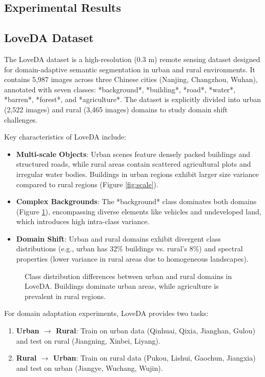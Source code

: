 \documentclass{article}
\begin{document}
\begin{multicols}{2}
		\section{Experimental Results}
		\subsection{LoveDA Dataset}  
		The LoveDA dataset \cite{loveda2021} is a high-resolution (0.3 m) remote sensing dataset designed for domain-adaptive semantic segmentation in urban and rural environments. It contains 5,987 images across three Chinese cities (Nanjing, Changzhou, Wuhan), annotated with seven classes: *background*, *building*, *road*, *water*, *barren*, *forest*, and *agriculture*. The dataset is explicitly divided into urban (2,522 images) and rural (3,465 images) domains to study domain shift challenges.  
		
		Key characteristics of LoveDA include:  
		\begin{itemize}  
			\item \textbf{Multi-scale Objects}: Urban scenes feature densely packed buildings and structured roads, while rural areas contain scattered agricultural plots and irregular water bodies. Buildings in urban regions exhibit larger size variance compared to rural regions (Figure \ref{fig:scale}).  
			\item \textbf{Complex Backgrounds}: The *background* class dominates both domains (Figure \ref{fig:class_dist}), encompassing diverse elements like vehicles and undeveloped land, which introduces high intra-class variance.  
			\item \textbf{Domain Shift}: Urban and rural domains exhibit divergent class distributions (e.g., urban has 32\% buildings vs. rural’s 8\%) and spectral properties (lower variance in rural areas due to homogeneous landscapes).  
		\end{itemize}  
		
		\begin{figure}[ht]  
			\begin{center}

			\caption{Class distribution differences between urban and rural domains in LoveDA. Buildings dominate urban areas, while agriculture is prevalent in rural regions.}  
			\label{fig:class_dist} 
			\end{center} 

		\end{figure}  
		
		For domain adaptation experiments, LoveDA provides two tasks:  
		\begin{enumerate}  
			\item \textbf{Urban $\rightarrow$ Rural}: Train on urban data (Qinhuai, Qixia, Jianghan, Gulou) and test on rural (Jiangning, Xinbei, Liyang).  
			\item \textbf{Rural $\rightarrow$ Urban}: Train on rural data (Pukou, Lishui, Gaochun, Jiangxia) and test on urban (Jiangye, Wuchang, Wujin).  
		\end{enumerate}  
		

\end{multicols}
\end{document}
